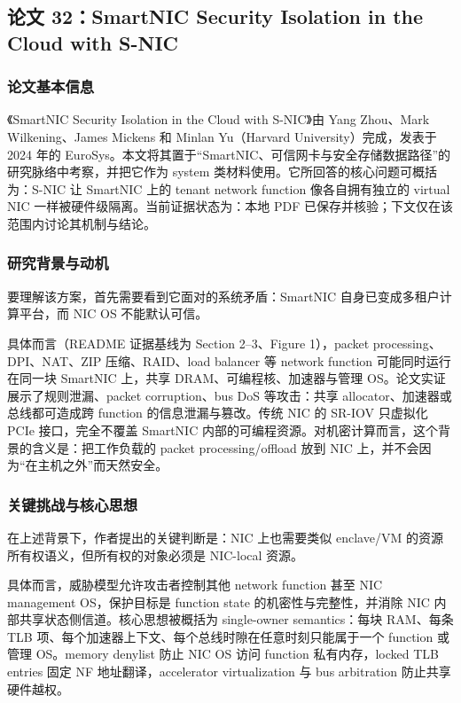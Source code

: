 \documentclass[11pt]{ctexart}
\begin{document}
\subsection{论文 32：SmartNIC Security Isolation in the Cloud with S-NIC}
\subsubsection{论文基本信息}
《SmartNIC Security Isolation in the Cloud with S-NIC》由 Yang Zhou、Mark Wilkening、James Mickens 和 Minlan Yu（Harvard University）完成，发表于 2024 年的 EuroSys。本文将其置于“SmartNIC、可信网卡与安全存储数据路径”的研究脉络中考察，并把它作为 system 类材料使用。它所回答的核心问题可概括为：S-NIC 让 SmartNIC 上的 tenant network function 像各自拥有独立的 virtual NIC 一样被硬件级隔离。当前证据状态为：本地 PDF 已保存并核验；下文仅在该范围内讨论其机制与结论。\cite{zhou2024snic}\par
\subsubsection{研究背景与动机}
要理解该方案，首先需要看到它面对的系统矛盾：SmartNIC 自身已变成多租户计算平台，而 NIC OS 不能默认可信。\par
具体而言（README 证据基线为 Section 2--3、Figure 1），packet processing、DPI、NAT、ZIP 压缩、RAID、load balancer 等 network function 可能同时运行在同一块 SmartNIC 上，共享 DRAM、可编程核、加速器与管理 OS。论文实证展示了规则泄漏、packet corruption、bus DoS 等攻击：共享 allocator、加速器或总线都可造成跨 function 的信息泄漏与篡改。传统 NIC 的 SR-IOV 只虚拟化 PCIe 接口，完全不覆盖 SmartNIC 内部的可编程资源。对机密计算而言，这个背景的含义是：把工作负载的 packet processing/offload 放到 NIC 上，并不会因为“在主机之外”而天然安全。\par
\subsubsection{关键挑战与核心思想}
在上述背景下，作者提出的关键判断是：NIC 上也需要类似 enclave/VM 的资源所有权语义，但所有权的对象必须是 NIC-local 资源。\par
具体而言，威胁模型允许攻击者控制其他 network function 甚至 NIC management OS，保护目标是 function state 的机密性与完整性，并消除 NIC 内部共享状态侧信道。核心思想被概括为 single-owner semantics：每块 RAM、每条 TLB 项、每个加速器上下文、每个总线时隙在任意时刻只能属于一个 function 或管理 OS。memory denylist 防止 NIC OS 访问 function 私有内存，locked TLB entries 固定 NF 地址翻译，accelerator virtualization 与 bus arbitration 防止共享硬件越权。\par
\end{document}
